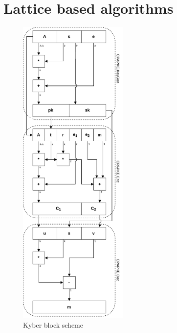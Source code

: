 \chapter{Lattice based algorithms}

\begin{figure}[h!]
  \centering
  \includegraphics[width=0.484\textwidth]{pictures/kyber_all.pdf}
  \caption{Kyber block scheme}
  \label{img:kyber_all}
\end{figure}

